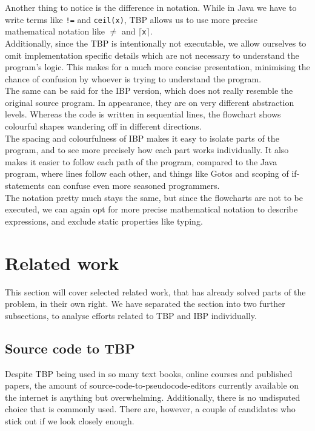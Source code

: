 Another thing to notice is the difference in notation. While in Java we have to write terms like \texttt{!=} and \texttt{ceil(x)}, TBP allows us to use more precise mathematical notation like \texttt{$\neq$} and \texttt{$\lceil$x$\rceil$}. \\

Additionally, since the TBP is intentionally not executable, we allow ourselves to omit implementation specific details which are not necessary to understand the program's logic. This makes for a much more concise presentation, minimising the chance of confusion by whoever is trying to understand the program. \\

The same can be said for the IBP version, which does not really resemble the original source program. In appearance, they are on very different abstraction levels. Whereas the code is written in sequential lines, the flowchart shows colourful shapes wandering off in different directions. \\

The spacing and colourfulness of IBP makes it easy to isolate parts of the program, and to see more precisely how each part works individually. It also makes it easier to follow each path of the program, compared to the Java program, where lines follow each other, and things like Gotos and scoping of if-statements can confuse even more seasoned programmers. \\

The notation pretty much stays the same, but since the flowcharts are not to be executed, we can again opt for more precise mathematical notation to describe expressions, and exclude static properties like typing.

\section{Related work}

This section will cover selected related work, that has already solved parts of the problem, in their own right. We have separated the section into two further subsections, to analyse efforts related to TBP and IBP individually.

\subsection{Source code to TBP}

Despite TBP being used in so many text books, online courses and published papers, the amount of source-code-to-pseudocode-editors currently available on the internet is anything but overwhelming. Additionally, there is no undisputed choice that is commonly used. There are, however, a couple of candidates who stick out if we look closely enough.

